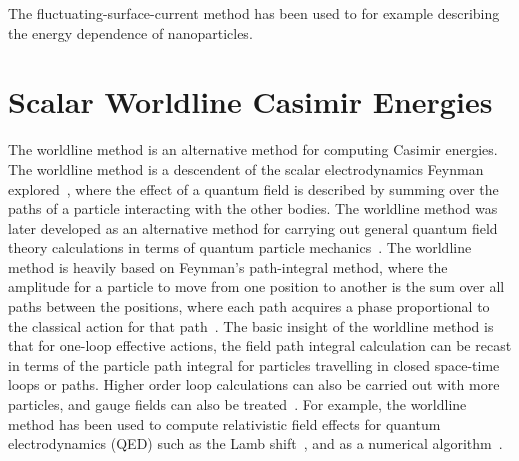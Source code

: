 The fluctuating-surface-current method has been used to 
for example describing the energy dependence of nanoparticles.







\section{Scalar Worldline Casimir Energies}

The worldline method is an alternative method for computing Casimir energies.
The worldline method is a descendent of the scalar electrodynamics 
Feynman explored~\cite{Feynman1950}, where the effect of a quantum
field is described by summing over the paths of a particle interacting with the other bodies. 
The worldline method was later developed as an alternative method for 
carrying out general quantum field theory calculations in terms of quantum particle 
mechanics~\cite{McKeon1993, Strassler1992,Schubert2001}.  
The worldline method is heavily based on Feynman's path-integral method, where the amplitude
for a particle to move from one position to another is the sum over all paths between the positions,
where each path acquires a phase proportional to the classical action for that path~\cite{Feynman1948,Feynman1965}.
The basic insight of the worldline method is that for one-loop effective actions, 
the field path integral calculation can be recast in terms of the particle path
 integral for particles travelling in closed space-time loops or paths.
  Higher order loop calculations can also be carried out with more particles, 
and gauge fields can also be treated~\cite{Schubert2001}.
  For example, the worldline method has been used to compute relativistic
 field effects for quantum electrodynamics (QED) such as the Lamb shift~\cite{Schmidt1995},
 and as a numerical algorithm~\cite{Mazur2014}.

